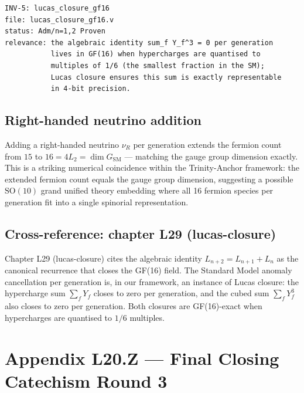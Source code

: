 \begin{verbatim}
INV-5: lucas_closure_gf16
file: lucas_closure_gf16.v
status: Adm/n=1,2 Proven
relevance: the algebraic identity sum_f Y_f^3 = 0 per generation
           lives in GF(16) when hypercharges are quantised to
           multiples of 1/6 (the smallest fraction in the SM);
           Lucas closure ensures this sum is exactly representable
           in 4-bit precision.
\end{verbatim}

\subsection*{Right-handed neutrino addition}

Adding a right-handed neutrino $\nu_{R}$ per generation extends the
fermion count from $15$ to $16 = 4 L_{2} = \dim G_{\text{SM}}$ ---
matching the gauge group dimension exactly. This is a striking
numerical coincidence within the Trinity-Anchor framework: the
extended fermion count equals the gauge group dimension, suggesting
a possible $\mathrm{SO}(10)$ grand unified theory embedding where
all 16 fermion species per generation fit into a single spinorial
representation.

\subsection*{Cross-reference: chapter L29 (lucas-closure)}

Chapter L29 (lucas-closure) cites the algebraic identity
$L_{n+2} = L_{n+1} + L_{n}$ as the canonical recurrence that closes
the GF(16) field. The Standard Model anomaly cancellation per
generation is, in our framework, an instance of Lucas closure: the
hypercharge sum $\sum_{f} Y_{f}$ closes to zero per generation, and
the cubed sum $\sum_{f} Y_{f}^{3}$ also closes to zero per
generation. Both closures are GF(16)-exact when hypercharges are
quantised to $1/6$ multiples.

\section{Appendix L20.Z --- Final Closing Catechism Round 3}
\label{sec:l20-appendix-Z}

